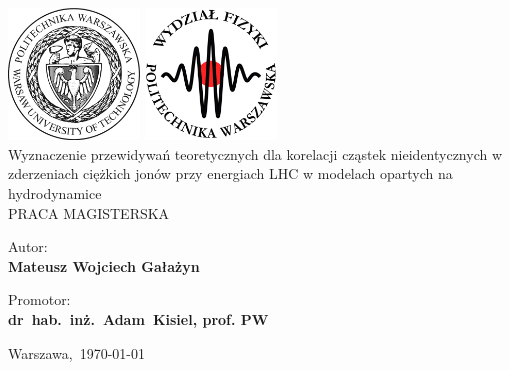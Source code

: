\documentclass[11pt,a4paper,openright]{report}
\begin{document}
\begin{titlepage}
	\includegraphics[height=3.5cm]{wut}
	    \hfill
	\includegraphics[height=3.5cm]{wut_physics}
	\center
	{\textbf{}}\\[2cm]
	{ \Huge Wyznaczenie przewidywań teoretycznych dla korelacji cząstek nieidentycznych w zderzeniach ciężkich jonów przy energiach LHC w modelach opartych na hydrodynamice}
	\\[3.2cm]


	\LARGE\uppercase{Praca magisterska}\\[1.3cm]
		\begin{flushright} \Large
		Autor:\hspace{2.2cm}~\\
		\textbf{Mateusz Wojciech Gałażyn}\\[-0.5cm]
		\end{flushright}

		\begin{flushright} \Large
		Promotor:\hspace{1.8cm}~\\
		\textbf{dr~hab.~inż.~Adam~{Kisiel}, prof. PW}\\[0cm]
		\end{flushright}

	{\large Warszawa,~\mydatePL\today}
	\vfill
\end{titlepage}
\cleardoublepage
{}
\linenumbers

\begin{abstract}

\end{abstract}
\cleardoublepage
\renewcommand{\abstractname}{Streszczenie}
\begin{abstract}

\end{abstract}
% 
\cleardoublepage
\pagestyle{empty}
\begingroup
\let\clearpage\relax
\tableofcontents
\endgroup
\cleardoublepage
\pagestyle{headings}
\end{document}
